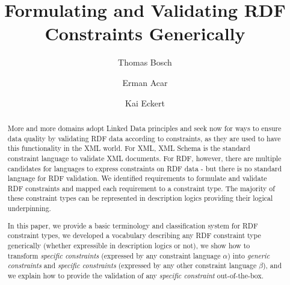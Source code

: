 \documentclass{llncs}
\newcommand{\ms}[1]{\texttt{#1}}
\begin{document}
%
%
\title{Formulating and Validating RDF Constraints Generically}
%
%
\author{Thomas Bosch \and Erman Acar \and Kai Eckert}
%
%

\maketitle              %

\begin{abstract}

More and more domains adopt Linked Data principles
and seek now for ways to ensure data quality by validating RDF data according to constraints, as they are used to have this functionality in the XML world.
For XML, XML Schema is the standard constraint language to validate XML documents.
For RDF, however, there are multiple candidates for languages to express constraints on RDF data - but there is no standard language for RDF validation.
We identified requirements to formulate and validate RDF constraints and mapped each requirement to a constraint type.
The majority of these constraint types can be represented in description logics providing their logical underpinning.

In this paper, we provide a basic terminology and classification system for RDF constraint types,
we developed a vocabulary describing any RDF constraint type generically (whether expressible in description logics or not),
we show how to transform \emph{specific constraints} (expressed by any constraint language \ms{$\alpha$}) into \emph{generic constraints} and \emph{specific constraints} (expressed by any other constraint language \ms{$\beta$}), and
we explain how to provide the validation of any \emph{specific constraint} out-of-the-box. 

\end{abstract}
%
\end{document}
